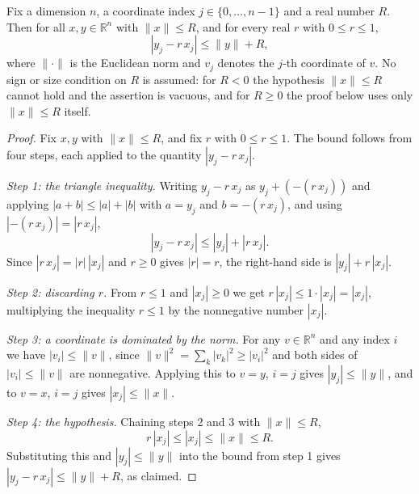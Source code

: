 \begin{lemma}
Fix a dimension $n$, a coordinate index $j \in \{0,\dots,n-1\}$ and a real
number $R$.  Then for all $x, y \in \mathbb{R}^n$ with $\|x\| \leq R$, and for
every real $r$ with $0 \leq r \leq 1$,
\[
  |y_j - r\,x_j| \leq \|y\| + R ,
\]
where $\|\cdot\|$ is the Euclidean norm and $v_j$ denotes the $j$-th coordinate
of $v$.  No sign or size condition on $R$ is assumed: for $R < 0$ the hypothesis
$\|x\| \leq R$ cannot hold and the assertion is vacuous, and for $R \geq 0$ the
proof below uses only $\|x\| \leq R$ itself.
\end{lemma}
\begin{proof}
Fix $x, y$ with $\|x\| \leq R$, and fix $r$ with $0 \leq r \leq 1$.  The bound
follows from four steps, each applied to the quantity $|y_j - r\,x_j|$.

\emph{Step 1: the triangle inequality.}  Writing $y_j - r\,x_j$ as
$y_j + (-(r\,x_j))$ and applying $|a+b| \leq |a| + |b|$ with $a = y_j$ and
$b = -(r\,x_j)$, and using $|-(r\,x_j)| = |r\,x_j|$,
\[
  |y_j - r\,x_j| \leq |y_j| + |r\,x_j| .
\]
Since $|r\,x_j| = |r|\,|x_j|$ and $r \geq 0$ gives $|r| = r$, the right-hand
side is $|y_j| + r\,|x_j|$.

\emph{Step 2: discarding $r$.}  From $r \leq 1$ and $|x_j| \geq 0$ we get
$r\,|x_j| \leq 1 \cdot |x_j| = |x_j|$, multiplying the inequality $r \leq 1$ by
the nonnegative number $|x_j|$.

\emph{Step 3: a coordinate is dominated by the norm.}  For any
$v \in \mathbb{R}^n$ and any index $i$ we have $|v_i| \leq \|v\|$, since
$\|v\|^2 = \sum_{k} |v_k|^2 \geq |v_i|^2$ and both sides of
$|v_i| \leq \|v\|$ are nonnegative.  Applying this to $v = y$, $i = j$ gives
$|y_j| \leq \|y\|$, and to $v = x$, $i = j$ gives $|x_j| \leq \|x\|$.

\emph{Step 4: the hypothesis.}  Chaining steps 2 and 3 with $\|x\| \leq R$,
\[
  r\,|x_j| \leq |x_j| \leq \|x\| \leq R .
\]
Substituting this and $|y_j| \leq \|y\|$ into the bound from step 1 gives
$|y_j - r\,x_j| \leq \|y\| + R$, as claimed.
\end{proof}
